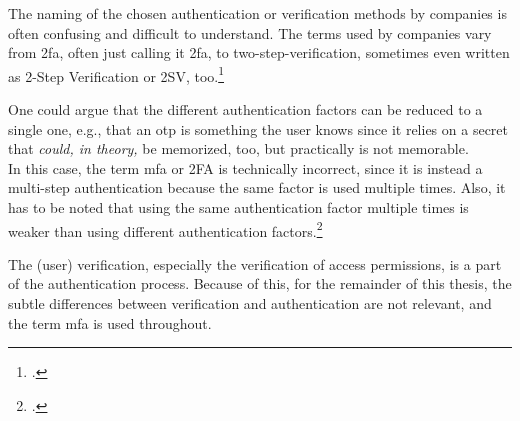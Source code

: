 The naming of the chosen authentication or verification methods by companies is often confusing and difficult to understand. The terms used by companies vary from \glsdesc{2fa}, often just calling it \gls{2fa}, to two-step-verification, sometimes even written as 2-Step Verification or 2SV, too.\footcites[See][]{apple_2fa}[See][]{apple_s2v}[See][]{playstation}[See][]{google_2-step_verification}[See][]{microsoft_2sv}

One could argue that the different authentication factors can be reduced to a single one, e.g., that an \gls{otp} is \frqq something the user knows\flqq{} since it relies on a secret that \textit{could, in theory,} be memorized, too, but practically is not memorable.\\
In this case, the term \gls{mfa} or 2FA is technically incorrect, since it is instead a multi-step authentication because the same factor is used multiple times. Also, it has to be noted that using the same authentication factor multiple times is weaker than using different authentication factors.\footcite[See][117]{grimes2017hacking}

The (user) verification, especially the verification of access permissions, is a part of the authentication process. Because of this, for the remainder of this thesis, the subtle differences between verification and authentication are not relevant, and the term \gls{mfa} is used throughout.